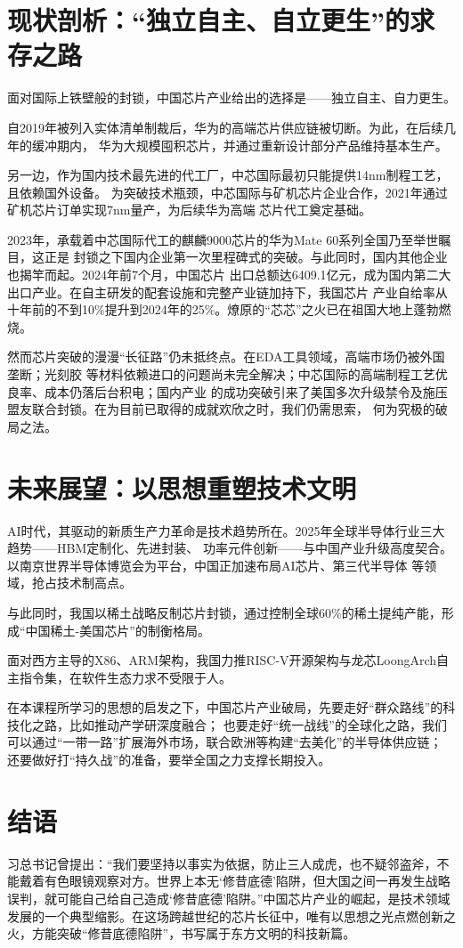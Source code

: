 \documentclass[a4paper,11pt,UTF8]{article}
\begin{document}
\section{现状剖析：“独立自主、自立更生”的求存之路}
	面对国际上铁壁般的封锁，中国芯片产业给出的选择是——独立自主、自力更生。
	
	自2019年被列入实体清单制裁后，华为的高端芯片供应链被切断。为此，在后续几年的缓冲期内，
华为大规模囤积芯片，并通过重新设计部分产品维持基本生产。
	
	另一边，作为国内技术最先进的代工厂，中芯国际最初只能提供14nm制程工艺，且依赖国外设备。
为突破技术瓶颈，中芯国际与矿机芯片企业合作，2021年通过矿机芯片订单实现7nm量产，为后续华为高端
芯片代工奠定基础。
	
	2023年，承载着中芯国际代工的麒麟9000芯片的华为Mate 60系列全国乃至举世瞩目，这正是
封锁之下国内企业第一次里程碑式的突破。与此同时，国内其他企业也揭竿而起。2024年前7个月，中国芯片
出口总额达6409.1亿元，成为国内第二大出口产业。在自主研发的配套设施和完整产业链加持下，我国芯片
产业自给率从十年前的不到10$\%$提升到2024年的25$\%$。燎原的“芯芯”之火已在祖国大地上蓬勃燃烧。
	
	然而芯片突破的漫漫“长征路”仍未抵终点。在EDA工具领域，高端市场仍被外国垄断；光刻胶
等材料依赖进口的问题尚未完全解决；中芯国际的高端制程工艺优良率、成本仍落后台积电；国内产业
的成功突破引来了美国多次升级禁令及施压盟友联合封锁。在为目前已取得的成就欢欣之时，我们仍需思索，
何为究极的破局之法。


\section{未来展望：以思想重塑技术文明}
	AI时代，其驱动的新质生产力革命是技术趋势所在。2025年全球半导体行业三大趋势——HBM定制化、先进封装、
功率元件创新——与中国产业升级高度契合。以南京世界半导体博览会为平台，中国正加速布局AI芯片、第三代半导体
等领域，抢占技术制高点。
	
	与此同时，我国以稀土战略反制芯片封锁，通过控制全球60$\%$的稀土提纯产能，形成“中国稀土-美国芯片”的制衡格局。
	
	面对西方主导的X86、ARM架构，我国力推RISC-V开源架构与龙芯LoongArch自主指令集，在软件生态力求不受限于人。
	
	在本课程所学习的思想的启发之下，中国芯片产业破局，先要走好“群众路线”的科技化之路，比如推动产学研深度融合；
也要走好“统一战线”的全球化之路，我们可以通过“一带一路”扩展海外市场，联合欧洲等构建“去美化”的半导体供应链；
还要做好打“持久战”的准备，要举全国之力支撑长期投入。

\section{结语}
	习总书记曾提出：“我们要坚持以事实为依据，防止三人成虎，也不疑邻盗斧，不能戴着有色眼镜观察对方。世界上本无‘修昔底德’陷阱，但大国之间一再发生战略误判，就可能自己给自己造成‘修昔底德’陷阱。”中国芯片产业的崛起，是技术领域发展的一个典型缩影。在这场跨越世纪的芯片长征中，唯有以思想之光点燃创新之火，方能突破“修昔底德陷阱”，书写属于东方文明的科技新篇。
\end{document}

